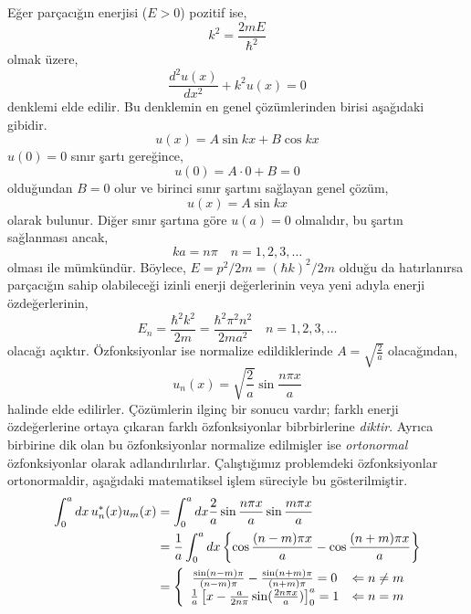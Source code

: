 \documentclass[a4paper,12pt, twoside]{article}
\begin{document}
Eğer parçacığın enerjisi ($E>0$) pozitif ise,
\begin{equation}
k ^ { 2 } = \frac { 2 m E } { \hbar ^ { 2 } }
\end{equation}
olmak üzere,
\begin{equation}
\frac { d ^ { 2 } u ( x ) } { d x ^ { 2 } } + k ^ { 2 } u ( x ) = 0
\end{equation}
denklemi elde edilir. Bu denklemin en genel çözümlerinden birisi aşağıdaki gibidir.
\begin{equation}
u(x) = A \sin k x + B \cos k x
\end{equation}
$u(0)=0$ sınır şartı gereğince,
\begin{equation*}
u(0) = A\cdot 0 + B = 0
\end{equation*}
olduğundan $B=0$ olur ve birinci sınır şartını sağlayan genel çözüm,
\begin{equation}
u(x) = A \sin k x
\end{equation}
olarak bulunur. Diğer sınır şartına göre $u(a)=0$ olmalıdır, bu şartın sağlanması ancak,
\begin{equation}
k a = n \pi \quad n = 1,2,3 , \ldots
\end{equation}
olması ile mümkündür. Böylece, $E = p^2/2m = (\hbar k)^2/2m$ olduğu da hatırlanırsa parçacığın sahip olabileceği izinli enerji değerlerinin veya yeni adıyla enerji özdeğerlerinin,
\begin{equation}
E _ { n } = \frac { \hbar ^ { 2 } k ^ { 2 } } { 2 m } = \frac { \hbar ^ { 2 } \pi ^ { 2 } n ^ { 2 } } { 2 m a ^ { 2 } } \quad n = 1,2,3 , \ldots
\end{equation}
olacağı açıktır. Özfonksiyonlar ise normalize edildiklerinde $A=\sqrt { \frac { 2 } { a } }$ olacağından,
\begin{equation}
u _ { n } ( x ) = \sqrt { \frac { 2 } { a } } \sin \frac { n \pi x } { a }
\end{equation}
halinde elde edilirler. Çözümlerin ilginç bir sonucu vardır; farklı enerji özdeğerlerine ortaya çıkaran farklı özfonksiyonlar bibrbirlerine \emph{diktir}. Ayrıca birbirine dik olan bu özfonksiyonlar normalize edilmişler ise \emph{ortonormal} özfonksiyonlar olarak adlandırılırlar. Çalıştığımız problemdeki özfonksiyonlar ortonormaldir, aşağıdaki matematiksel işlem süreciyle bu gösterilmiştir.
\begin{align} 
	\int _ { 0 } ^ { a } d x \, u _ { n } ^ { * } ( x ) u _ { m } ( x ) 
	& = \int _ { 0 } ^ { a } d x \frac { 2 } { a } \sin \frac { n \pi x } { a } \sin \frac { m \pi x } { a } \nonumber\\ 
	& = \frac { 1 } { a } \int _ { 0 } ^ { a } d x \left\{ \cos \frac { ( n - m ) \pi x } { a } - \cos \frac { ( n + m ) \pi x } { a } \right\} \nonumber\\ 
&=\left\{
\begin{array} { c l }
{ \frac { \sin ( n - m ) \pi } { ( n - m ) \pi } - \frac { \sin ( n + m ) \pi } { ( n + m ) \pi } = 0 } & { \Leftarrow n \neq m } \\ 
{\frac{1}{a}\left[x-\frac{a}{2 n \pi}\sin(\frac{2n\pi x}{a})\right]_0^a = 1 } & { \Leftarrow n = m} 
\end{array} 
\right.
\end{align}
\end{document}
